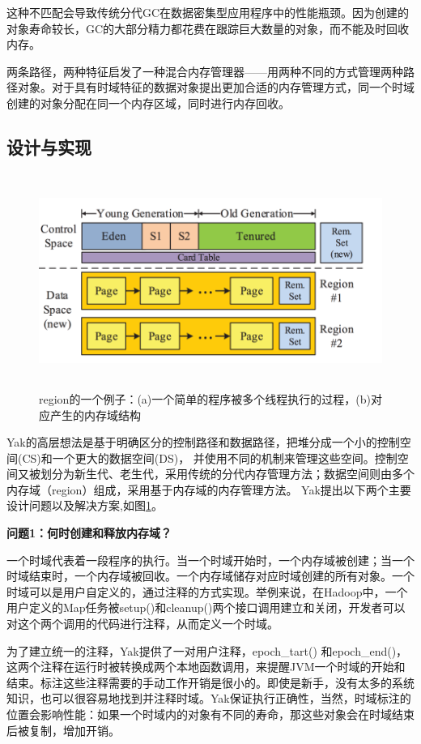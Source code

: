 这种不匹配会导致传统分代GC在数据密集型应用程序中的性能瓶颈。因为创建的对象寿命较长，GC的大部分精力都花费在跟踪巨大数量的对象，而不能及时回收内存。 

两条路径，两种特征启发了一种混合内存管理器——用两种不同的方式管理两种路径对象。对于具有时域特征的数据对象提出更加合适的内存管理方式，同一个时域创建的对象分配在同一个内存区域，同时进行内存回收。

\subsection{设计与实现}
\begin{figure}[h]
    \centering
    \includegraphics[width=12cm,height=7cm]{figure/layout.png}
    \caption{
        region的一个例子：(a)一个简单的程序被多个线程执行的过程，(b)对应产生的内存域结构
    }
    \label{img3}
\end{figure}
Yak的高层想法是基于明确区分的控制路径和数据路径，把堆分成一个小的控制空间(CS)和一个更大的数据空间(DS)， 并使用不同的机制来管理这些空间。控制空间又被划分为新生代、老生代，采用传统的分代内存管理方法；数据空间则由多个内存域（region）组成，采用基于内存域的内存管理方法。
Yak提出以下两个主要设计问题以及解决方案,如图\ref{img3}。

{\bfseries 问题1：何时创建和释放内存域？}

一个时域代表着一段程序的执行。当一个时域开始时，一个内存域被创建；当一个时域结束时，一个内存域被回收。一个内存域储存对应时域创建的所有对象。一个时域可以是用户自定义的，通过注释的方式实现。举例来说，在Hadoop中，一个用户定义的Map任务被setup()和cleanup()两个接口调用建立和关闭，开发者可以对这个两个调用的代码进行注释，从而定义一个时域。

为了建立统一的注释，Yak提供了一对用户注释，epoch\_tart() 和epoch\_end()，这两个注释在运行时被转换成两个本地函数调用，来提醒JVM一个时域的开始和结束。标注这些注释需要的手动工作开销是很小的。即使是新手，没有太多的系统知识，也可以很容易地找到并注释时域。Yak保证执行正确性，当然，时域标注的位置会影响性能：如果一个时域内的对象有不同的寿命，那这些对象会在时域结束后被复制，增加开销。

